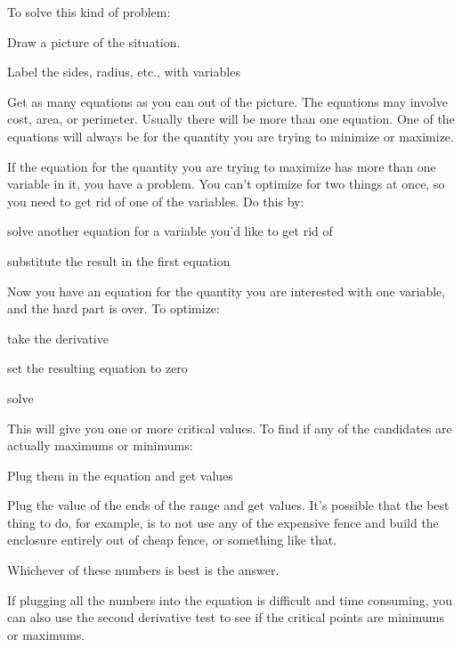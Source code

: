 \documentclass[fleqn]{article}
\begin{document}
To solve this kind of problem:
\begin{itemize*}
\item Draw a picture of the situation.  
\item Label the sides, radius, etc., with variables
\item Get as many equations as you can out of the picture.  The equations may involve cost, area, or perimeter.  Usually
  there will be more than one equation.  One of the equations will always be for the quantity you are trying to minimize
  or maximize.

\item If the equation for the quantity you are trying to maximize has more than one variable in it, you have a problem.
  You can't optimize for two things at once, so you need to get rid of one of the variables.  Do this by:
  \begin{itemize*}
    \item solve another equation for a variable you'd like to get rid of
    \item substitute the result in the first equation  
  \end{itemize*}

\end{itemize*}

Now you have an equation for the quantity you are interested with one variable, and the hard part is over.  To optimize:
\begin{itemize*}
  \item take the derivative
  \item set the resulting equation to zero
  \item solve
\end{itemize*}

This will give you one or more critical values.  To find if any of the candidates are actually maximums or minimums:
\begin{itemize*}
  \item Plug them in the equation and get values
  \item Plug the value of the ends of the range and get values.  It's possible that the best thing to do, for example,
    is to not use any of the expensive fence and build the enclosure entirely out of cheap fence, or something like
    that.
  \item Whichever of these numbers is best is the answer.
\end{itemize*}

If plugging all the numbers into the equation is difficult and time consuming, you can also use the second derivative
test to see if the critical points are minimums or maximums.
\end{document}
